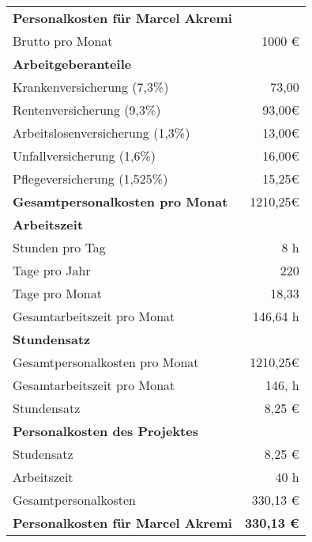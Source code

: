 \begin{tabularx}{\textwidth}{Xr}
    \rowcolor{heading}\textbf{Personalkosten für Marcel Akremi} & \textbf{} \\
    Brutto pro Monat & 1000 € \\
    \rowcolor{odd}\textbf{Arbeitgeberanteile} & \textbf{} \\
    Krankenversicherung (7,3\%) & 73,00 \\
    \rowcolor{odd}Rentenversicherung (9,3\%) & 93,00€ \\
    Arbeitslosenversicherung (1,3\%) & 13,00€ \\
    \rowcolor{odd}Unfallversicherung (1,6\%) & 16,00€ \\
    Pflegeversicherung (1,525\%) & 15,25€ \\
    \rowcolor{odd}\textbf{Gesamtpersonalkosten pro Monat} & 1210,25€ \\
    \textbf{Arbeitszeit} & \textbf{} \\
    \rowcolor{odd}Stunden pro Tag & 8 h \\
    Tage pro Jahr & 220 \\
    \rowcolor{odd}Tage pro Monat & 18,33 \\
    Gesamtarbeitszeit pro Monat & 146,64 h \\
    \rowcolor{odd}\textbf{Stundensatz} & \textbf{} \\
    Gesamtpersonalkosten pro Monat & 1210,25€ \\
    \rowcolor{odd}Gesamtarbeitszeit pro Monat & 146, h \\
    Stundensatz & 8,25 € \\
    \rowcolor{odd}\textbf{Personalkosten des Projektes} & \textbf{} \\
    Studensatz & 8,25 € \\
    \rowcolor{odd}Arbeitszeit & 40 h \\
    Gesamtpersonalkosten & 330,13 € \\
    \hline
    \hline
    \rowcolor{heading}\textbf{Personalkosten für Marcel Akremi} & \textbf{330,13 €} \\
    \end{tabularx}
